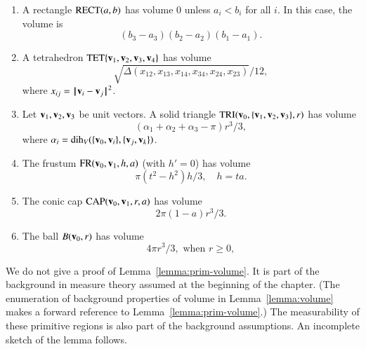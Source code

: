 \begin{lemma}\label{lemma:prim-volume} 
\begin{enumerate} 
\item{} A rectangle ${\operatorname{RECT}}(a,b)$
has volume $0$ unless $a_i<b_i$ for all $i$.  In this case, the
volume is
\begin{displaymath}(b_3-a_3)(b_2-a_2)(b_1-a_1).\end{displaymath}
\item{} A tetrahedron ${\operatorname{TET}}\{{\mathbf v}_1,{\mathbf v}_2,{\mathbf v}_3,{\mathbf v}_4\}$
has volume
\begin{displaymath}
\sqrt{\Delta(x_{12},x_{13},x_{14},x_{34},x_{24},x_{23})}/12,
\end{displaymath}
where $x_{ij} = \norm{\v_i}{\v_j}^2$.
\item {} Let ${\mathbf v}_1,{\mathbf v}_2,{\mathbf v}_3$ be unit vectors.  A solid
triangle ${\operatorname{TRI}}({\mathbf v}_0,\{{\mathbf v}_1,{\mathbf v}_2,{\mathbf v}_3\},r)$ has
volume
\begin{displaymath}
(\alpha_1+\alpha_2+\alpha_3-\pi)r^3/3,
\end{displaymath}
where $\alpha_i = \operatorname{dih}_V(\{{\mathbf v}_0,{\mathbf v}_i\},\{{\mathbf v}_j,{\mathbf v}_k\})$.
\item {} The frustum ${\operatorname{FR}}({\mathbf v}_0,{\mathbf v}_1,h,a)$ (with $h'=0$) 
has volume
\begin{displaymath}
\pi (t^2-h^2) h/3,\quad h = t a.
\end{displaymath}
\item {} The conic cap ${\operatorname{CAP}}({\mathbf v}_0,{\mathbf v}_1,r,a)$
has volume
\begin{displaymath}
2\pi(1-a) r^3/3.
\end{displaymath}
\item{} The ball $B({\mathbf v}_0,r)$ has volume
\begin{displaymath}
4\pi r^3/3,\text{ when } r \ge 0,
\end{displaymath}
\end{enumerate}
\end{lemma}



We do not give a proof of Lemma~\ref{lemma:prim-volume}.  It is part 
of the background in measure theory assumed at the beginning of the chapter.
(The enumeration of background properties of volume in 
Lemma~\ref{lemma:volume} makes a forward
reference to Lemma~\ref{lemma:prim-volume}.)  The measurability
of these primitive regions is also part of the background assumptions.
An incomplete sketch of the lemma follows.

